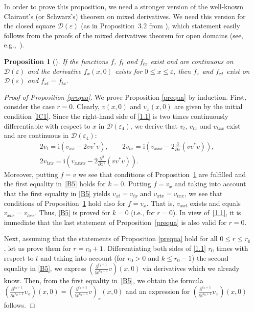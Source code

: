 \documentclass[pdftex]{sigma}
\newtheorem{Proposition}[Theorem]{Proposition}
{\theoremstyle{definition}
\newtheorem{Definition}[Theorem]{Definition}
\newtheorem{Notation}[Theorem]{Notation}
\newtheorem{Example}[Theorem]{Example}
\newtheorem{Remark}[Theorem]{Remark}
}
\def\ve{\varepsilon}
\def\p{\partial}
\newcommand{\I}{\mathrm{i}}
\newcommand{\cD}{{\mathcal D}}
\numberwithin{equation}{section}
\begin{document}
In order to prove this proposition, we need a stronger version of the well-known Clairaut's (or Schwarz's) theorem on mixed derivatives.
We need this version for the closed square $\cD(\ve)$ (as in Proposition~3.2 from \cite{Sa14b}), which
statement easily follows from the proofs of the mixed derivatives theorem for open domains (see, e.g.,~\cite{See}).
\begin{Proposition}[\cite{Sa14b}]\label{PnB2} If the functions $f$, $f_t$ and $f_{tx}$ exist and are continuous on $\cD(\ve)$
and the derivative $f_x(x, 0)$ exists for $0\leq x \leq \ve$, then $f_x$ and $f_{xt}$ exist on $\cD(\ve)$
and $f_{xt}=f_{tx}$.
\end{Proposition}
\begin{proof}[Proof of Proposition \ref{prequa}]
We prove Proposition \ref{prequa} by induction. First, consider the case $r=0$.
Clearly, $v(x,0)$ and $v_x(x,0)$ are given by the initial condition \eqref{IC1}.
Since the right-hand side of \eqref{1.1} is two times continuously dif\/ferentiable with respect to $x$ in $\cD(\ve_4)$,
we derive that $v_t$, $v_{tx}$ and $v_{txx}$ exist and are continuous in $\cD(\ve_4)$:
\begin{gather*}
2v_t=\I(v_{xx}-2vv^*v), \qquad 2v_{tx}=\I\left(v_{xxx}-2\frac{\p}{\p x}(vv^*v)\right), \\ 2v_{txx}=\I\left(v_{xxxx}-2\frac{\p^2}{\p x^2}(vv^*v)\right).
\end{gather*}
Moreover, putting $f=v$ we see that conditions of Proposition~\ref{PnB2}
are fulf\/illed and the f\/irst equality in~\eqref{B5} holds for $k=0$. Putting $f=v_x$ and taking into account that the f\/irst equality
in \eqref{B5} yields $v_{xt}=v_{tx}$ and $v_{xtx}=v_{txx}$, we see that conditions of Proposition~\ref{PnB2} hold also for $f=v_x$.
That is, $v_{xxt}$ exists and equals $v_{xtx}=v_{txx}$. Thus, \eqref{B5} is proved for $k=0$ (i.e., for $r=0$). In view of~\eqref{1.1}, it is immediate that the
last statement of Proposition~\ref{prequa} is also valid for $r=0$.

Next, assuming that the statements of Proposition \ref{prequa} hold for all $0\leq r \leq r_0$, let us prove them for $r=r_0+1$.
Dif\/ferentiating both sides of \eqref{1.1} $r_0$ times with respect to $t$ and taking into account (for $r_0>0$ and $k\leq r_0-1$) the second
equality in \eqref{B5}, we express $\left(\frac{\p^{r_0+1}}{\p t^{r_0+1}}v\right)(x,0)$ via derivatives which we already know.
Then, from the f\/irst equality in~\eqref{B5}, we obtain the formula $\left(\frac{\p^{r_0+1}}{\p t^{r_0+1}}v_x\right)(x,0)=\left(\frac{\p^{r_0+1}}{\p t^{r_0+1}}v\right)_x(x,0)$
and an expression for $\left(\frac{\p^{r_0+1}}{\p t^{r_0+1}}v_x\right)(x,0)$ follows.


\end{proof}
\end{document}
